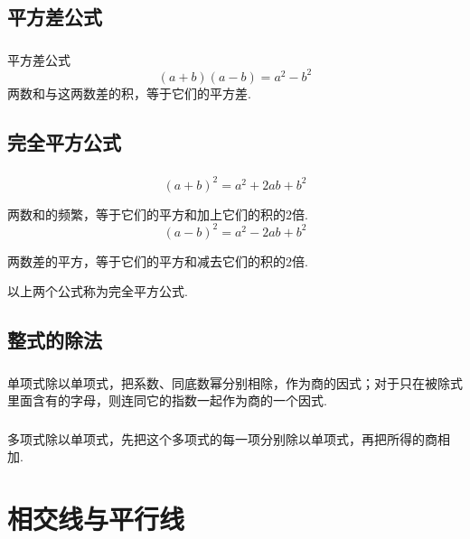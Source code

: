 \documentclass[fontset=windows]{ctexrep}
\begin{document}
\subsection{}
\section{平方差公式}
\subsection{}
\par {\heiti 平方差公式}\[(a+b)(a-b)=a^2-b^2\]两数和与这两数差的积，等于它们的平方差.
\subsection{}
\section{完全平方公式}
\subsection{}
\[(a+b)^2=a^2+2ab+b^2\]
\par 两数和的频繁，等于它们的平方和加上它们的积的$2$倍.
\[(a-b)^2=a^2-2ab+b^2\]
\par 两数差的平方，等于它们的平方和减去它们的积的$2$倍.
\par 以上两个公式称为{\heiti 完全平方公式}.
\subsection{}
\section{整式的除法}
\subsection{}
\par 单项式除以单项式，把系数、同底数幂分别相除，作为商的因式；对于只在被除式里面含有的字母，则连同它的指数一起作为商的一个因式.
\subsection{}
\par 多项式除以单项式，先把这个多项式的每一项分别除以单项式，再把所得的商相加.
\chapter{相交线与平行线}
\end{document}
